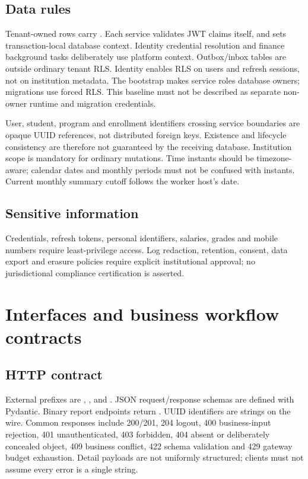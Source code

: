 \documentclass[10pt,a4paper]{article}
\begin{document}
\subsection{Data rules}
Tenant-owned rows carry . Each service validates JWT
claims itself, and sets transaction-local database context. Identity credential
resolution and finance background tasks deliberately use platform context.
Outbox/inbox tables are outside ordinary tenant RLS. Identity enables RLS on
users and refresh sessions, not on institution metadata.
The bootstrap makes service roles database owners; migrations use forced RLS.
This baseline must not be described as separate non-owner runtime and migration
credentials.

User, student, program and enrollment identifiers crossing service
boundaries are opaque UUID references, not distributed foreign keys. Existence and
lifecycle consistency are therefore not guaranteed by the receiving database.
Institution scope is mandatory for ordinary mutations. Time instants should be
timezone-aware; calendar dates and monthly periods must not be confused with instants.
Current monthly summary cutoff follows the worker host's date.

\subsection{Sensitive information}
Credentials, refresh tokens, personal identifiers, salaries, grades and mobile
numbers require least-privilege access. Log redaction, retention, consent, data export
and erasure policies require explicit institutional approval; no jurisdictional
compliance certification is asserted.

\clearpage
\section{Interfaces and business workflow contracts}
\subsection{HTTP contract}
External prefixes are , ,
 and . JSON request/response schemas are
defined with Pydantic. Binary report endpoints return .
UUID identifiers are strings on the wire. Common responses include 200/201,
204 logout, 400 business-input rejection, 401 unauthenticated, 403 forbidden,
404 absent or deliberately concealed object, 409 business conflict, 422 schema
validation and 429 gateway budget exhaustion. Detail payloads are not uniformly
structured; clients must not assume every error is a single string.
\end{document}
